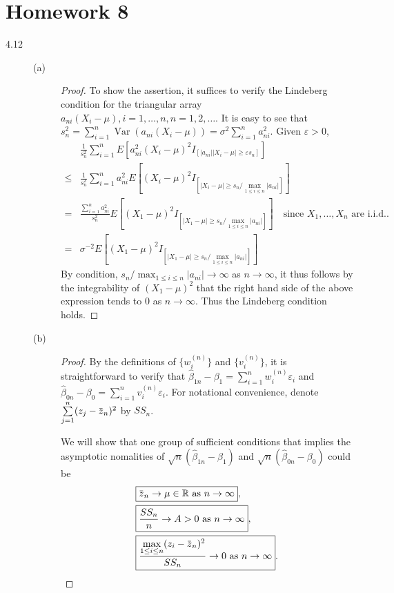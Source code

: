 \documentclass{article}
\newcommand{\eps}{\varepsilon}
\newcommand{\real}{\mathbb{R}}
\newcommand{\overbar}[1]{\mkern 1.5mu\overline{\mkern-1.5mu#1\mkern-1.5mu}\mkern 1.5mu}
\DeclareMathOperator*{\Var}{Var}
\theoremstyle{definition}
\theoremstyle{plain}
\theoremstyle{remark}
\begin{document}
\section*{Homework 8}
\begin{description}
\item[4.12]
\begin{description} 
\item[(a)]
\begin{proof}
To show the assertion, it suffices to verify the Lindeberg condition for the triangular
array $a_{ni}(X_i - \mu), i = 1, \ldots, n, n = 1, 2, \ldots$. It is easy to see that 
$s_n^2 = \sum\limits_{i = 1}^n \Var(a_{ni}(X_i - \mu)) = \sigma^2\sum\limits_{i = 1}^n 
a_{ni}^2$. Given $\eps > 0$, 
\begin{align*}
    & \frac{1}{s_n^2} \sum_{i = 1}^n E[a_{ni}^2(X_i - \mu)^2 
    I_{[|a_{ni}||X_i - \mu| \geq \eps s_n]}] \\
 \leq & \frac{1}{s_n^2} \sum_{i = 1}^n a_{ni}^2 E[(X_i - \mu)^2 I_{[|X_i - \mu| \geq 
 s_n / \max_{1 \leq i \leq n} |a_{ni}|]}] \\
 = & \frac{\sum\limits_{i = 1}^n a_{ni}^2}{s_n^2} E[(X_1 - \mu)^2 I_{[|X_1 - \mu| \geq 
 s_n / \max_{1 \leq i \leq n} |a_{ni}|]}]  \quad 
 \text{since $X_1, \ldots, X_n$ are i.i.d..} \\
 = & \sigma^{-2} E[(X_1 - \mu)^2 I_{[|X_1 - \mu| \geq s_n / \max_{1 \leq i \leq n} |a_{ni}|]}]
\end{align*}
By condition, $s_n / \max_{1 \leq i \leq n} |a_{ni}| \to \infty$ as $n \to \infty$, it 
thus follows by the integrability of $(X_1 - \mu)^2$ that the right hand side of the above
expression tends to $0$ as $n \to \infty$. Thus the Lindeberg condition holds. 
\end{proof}

\item[(b)]
\begin{proof}
By the definitions of $\{w_i^{(n)}\}$ and $\{v_i^{(n)}\}$, it is straightforward to verify that $\hat{\beta}_{1n} - \beta_1 = \sum\limits_{i = 1}^n w_i^{(n)} \eps_i$ and $\hat{\beta}_{0n} - \beta_0 = \sum\limits_{i = 1}^n v_i^{(n)} \eps_i$.
For notational convenience, denote $\sum\limits_{j = 1}^n (z_j - \overbar{z}_n)^2$ by $SS_n$.

We will show that one group of sufficient conditions that implies the asymptotic nomalities of $\sqrt{n}(\hat{\beta}_{1n} - \beta_1)$ and $\sqrt{n}(\hat{\beta}_{0n} - \beta_0)$ could be
\begin{align}
& \boxed{\overbar{z}_n \to \mu \in \real \text{ as } n \to \infty}, \label{hw8:eq1} \\
& \boxed{\frac{SS_n}{n} \to A > 0 \text{ as } n \to \infty}, \label{hw8:eq2} \\
& \boxed{\frac{\max\limits_{1 \leq i \leq n} (z_i - \overbar{z}_n)^2}{SS_n} \to 0 \text{ as } n \to \infty}. \label{hw8:eq3}
\end{align}


\end{proof}
\end{description}
\end{description}
\end{document}
